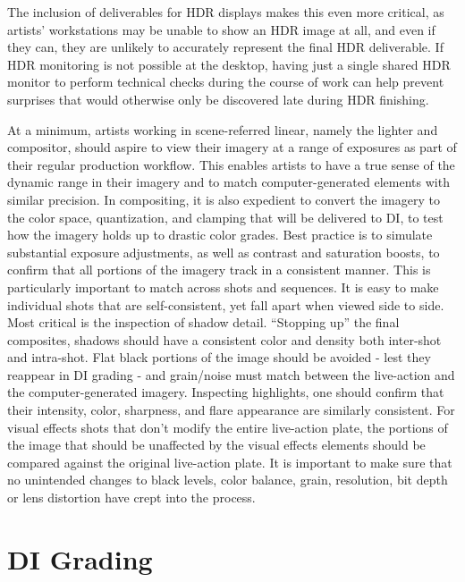 The inclusion of deliverables for HDR displays makes this even more critical, as artists’ workstations may be unable to show an HDR image at all, and even if they can, they are unlikely to accurately represent the final HDR deliverable. If HDR monitoring is not possible at the desktop, having just a single shared HDR monitor to perform technical checks during the course of work can help prevent surprises that would otherwise only be discovered late during HDR finishing.

At a minimum, artists working in scene-referred linear, namely the lighter and compositor, should aspire to view their imagery at a range of exposures as part of their regular production workflow. This enables artists to have a true sense of the dynamic range in their imagery and to match computer-generated elements with similar precision. In compositing, it is also expedient to convert the imagery to the color space, quantization, and clamping that will be delivered to DI, to test how the imagery holds up to drastic color grades. Best practice is to simulate substantial exposure adjustments, as well as contrast and saturation boosts, to confirm that all portions of the imagery track in a consistent manner. This is particularly important to match across shots and sequences. It is easy to make individual shots that are self-consistent, yet fall apart when viewed side to side. Most critical is the inspection of shadow detail. “Stopping up” the final composites, shadows should have a consistent color and density both inter-shot and intra-shot. Flat black portions of the image should be avoided - lest they reappear in DI grading - and grain/noise must match between the live-action and the computer-generated imagery. Inspecting highlights, one should confirm that their intensity, color, sharpness, and flare appearance are similarly consistent. For visual effects shots that don’t modify the entire live-action plate, the portions of the image that should be unaffected by the visual effects elements should be compared against the original live-action plate. It is important to make sure that no unintended changes to black levels, color balance, grain, resolution, bit depth or lens distortion have crept into the process.

\section{DI Grading}

